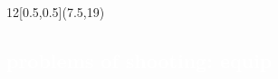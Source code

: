 \begin{frame}
\cleardoublepage
\pagecolor{black}

\begin{textblock}{12}[0.5,0.5](7.5,19)
    \textcolor{white}{
    \part[Equip]{problems of shooting: equip}
    \label{shooting}
	}
\end{textblock}

\end{frame}




